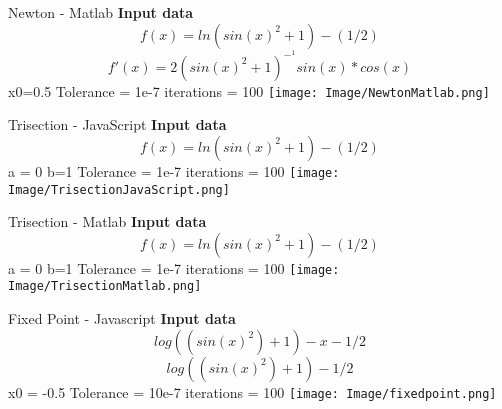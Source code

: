 \documentclass{article}
\begin{document}
\begin{section}{Newton - Matlab}
   \textbf{Input data}\newline
    \[f(x)=ln(sin(x)^2+1)-(1/2)\]\newline
    \[f'(x)=2(sin(x)^2+1)^-^1 sin(x)*cos(x)\]\newline
    x0=0.5 \newline
    Tolerance = 1e-7\newline
    iterations = 100 \newline\newline
    \texttt{[image: Image/NewtonMatlab.png]}
\end{section}
\begin{section}{Trisection - JavaScript}
   \textbf{Input data}\newline
    \[f(x)=ln(sin(x)^2+1)-(1/2)\]\newline
    a = 0\newline
    b=1 \newline
    Tolerance = 1e-7\newline
    iterations = 100 \newline\newline
    \texttt{[image: Image/TrisectionJavaScript.png]}
\end{section}
\begin{section}{Trisection - Matlab}
   \textbf{Input data}\newline
    \[f(x)=ln(sin(x)^2+1)-(1/2)\]\newline
    a = 0\newline
    b=1 \newline
    Tolerance = 1e-7\newline
    iterations = 100 \newline\newline
    \texttt{[image: Image/TrisectionMatlab.png]}
\end{section}
\begin{section}{Fixed Point - Javascript}
   \textbf{Input data}\newline
    \[log((sin(x)^2)+1)-x-1/2\]\newline
    \[log((sin(x)^2)+1)-1/2\]\newline
    x0 = -0.5\newline
    Tolerance = 10e-7\newline
    iterations = 100 \newline\newline
    \texttt{[image: Image/fixedpoint.png]}
\end{section}
\end{document}
